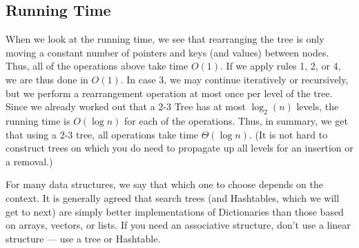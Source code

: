 \subsection{Running Time}
When we look at the running time, we see that rearranging the tree is
only moving a constant number of pointers and keys (and values)
between nodes. Thus, all of the operations above take time $O(1)$.
If we apply rules 1, 2, or 4, we are thus done in $O(1)$. In case 3, we may
continue iteratively or recursively, but we perform a rearrangement
operation at most once per level of the tree. Since we already worked
out that a 2-3 Tree has at most $\log_2(n)$ levels, the running time
is $O(\log n)$ for each of the operations.
Thus, in summary, we get that using a 2-3 tree, all operations take
time $\Theta(\log n)$. (It is not hard to construct trees on which you
do need to propagate up all levels for an insertion or a removal.)

For many data structures, we say that which one to choose depends on
the context. It is generally agreed that search trees (and Hashtables,
which we will get to next) are simply better implementations of
Dictionaries than those based on arrays, vectors, or lists. If you
need an associative structure, don't use a linear structure --- use a
tree or Hashtable.
